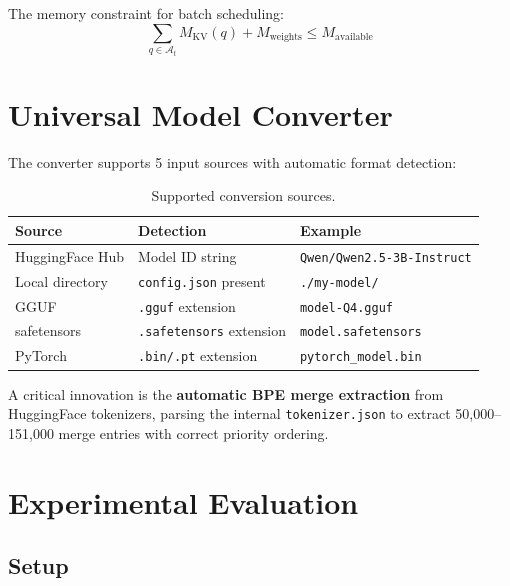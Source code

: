 \documentclass[12pt,a4paper]{article}
\begin{document}
The memory constraint for batch scheduling:
\begin{equation}
\sum_{q \in \mathcal{A}_t} M_{\text{KV}}(q) + M_{\text{weights}} \leq M_{\text{available}}
\label{eq:batch_memory}
\end{equation}

\section{Universal Model Converter}
\label{sec:converter}

The converter supports 5 input sources with automatic format detection:

\begin{table}[H]
\centering
\caption{Supported conversion sources.}
\begin{tabular}{@{}llp{6cm}@{}}
\toprule
\textbf{Source} & \textbf{Detection} & \textbf{Example} \\
\midrule
HuggingFace Hub & Model ID string & \texttt{Qwen/Qwen2.5-3B-Instruct} \\
Local directory & \texttt{config.json} present & \texttt{./my-model/} \\
GGUF & \texttt{.gguf} extension & \texttt{model-Q4.gguf} \\
safetensors & \texttt{.safetensors} extension & \texttt{model.safetensors} \\
PyTorch & \texttt{.bin/.pt} extension & \texttt{pytorch\_model.bin} \\
\bottomrule
\end{tabular}
\end{table}

A critical innovation is the \textbf{automatic BPE merge extraction} from HuggingFace tokenizers, parsing the internal \texttt{tokenizer.json} to extract 50,000--151,000 merge entries with correct priority ordering.

\section{Experimental Evaluation}
\label{sec:evaluation}

\subsection{Setup}
\end{document}
